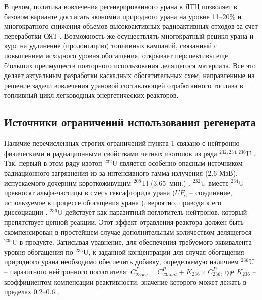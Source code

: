 В целом, политика вовлечения регенерированного урана в ЯТЦ позволяет в базовом варианте достигать экономии природного урана на уровне 11--20\% и многократного снижения объемов высокоактивных радиоактивных отходов за счет переработки ОЯТ \cite{delculAnalysisReuseUranium2009}. Возможность же осуществлять многократный рецикл урана и курс на удлинение (пролонгацию) топливных кампаний, связанный с повышением исходного уровня обогащения, открывает перспективы еще б`ольших преимуществ повторного использования делящегося материала.
Все это делает актуальным разработки каскадных обогатительных схем, направленные на решение задачи вовлечения урановой составляющей отработанного топлива в топливный цикл легководных энергетических реакторов.


\subsection{Источники ограничений использования регенерата}\label{sec:ch1/sec1.2}
Наличие перечисленных строгих ограничений пункта 1 связано с нейтронно-физическими и радиационными свойствами четных изотопов из ряда $^{232,234,236}$U \cite{smirnovEvolutionIsotopicComposition2012, proselkovAnalizVozmozhnostiIspolzovaniya2003, dudnikovInfluence236UEfficacy2016}. Так, первый в этом ряду изотоп $^{232}$U является особенно опасным источником радиационного загрязнения из-за интенсивного гамма-излучения (2.6 МэВ), испускаемого дочерним короткоживущим $^{208}$Tl (3.65 мин.) \cite{article}. 
$^{232}$U вместе $^{234}$U превносят альфа-частицы в смесь гексафторида урана ($UF_6$ -- соединение, используемое в процессе обогащения урана \cite{orlovWayObtainUranium2015, orlovDesublimationPurificationTransporting2017}), вероятно, приводя к его диссоциации \cite{kryuchkovObogashchennyyUranDobavleniem2007, bernhardtRadiationEffectsAlpha1958}. $^{236}$U действует как паразитный поглотитель нейтронов, который препятствует цепной реакции. Этот эффект отравления реактора должен быть скомпенсирован в простейшем случае дополнительным количеством делящегося $^{235}$U в продукте. Записывая уравнение, для обеспечения требуемого эквивалента уровня обогащения по $^{235}$U, к заданной концентрации для случая обогащения природного урана необходимо обеспечить добавку, определяемую наличием $^{236}$U -- паразитного нейтронного поглотителя:
$C_{235 e q}^{P}=C_{235 n a t}^{P}+K_{236} \times C_{236}^{P}$,
где $K_{236}$ -- коэффициентом компенсации реактивности, значение которого может лежать в пределах 0.2--0.6 \cite{delagarzaMulticomponentIsotopeSeparation1961, delculAnalysisReuseUranium2009}.

